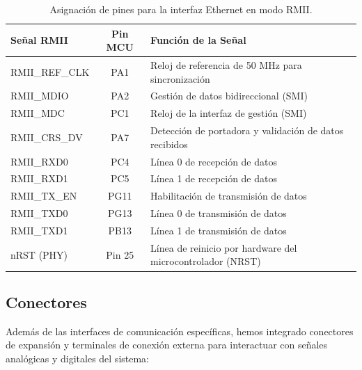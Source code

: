 \documentclass[12pt,a4paper]{article}
\begin{document}
\begin{table}[H]
\centering
\small
\begin{tabularx}{\textwidth}{|l|c|X|}
\hline
\textbf{Señal RMII} & \textbf{Pin MCU} & \textbf{Función de la Señal} \\ \hline
RMII\_REF\_CLK & PA1 & Reloj de referencia de 50 MHz para sincronización \\ \hline
RMII\_MDIO & PA2 & Gestión de datos bidireccional (SMI) \\ \hline
RMII\_MDC & PC1 & Reloj de la interfaz de gestión (SMI) \\ \hline
RMII\_CRS\_DV & PA7 & Detección de portadora y validación de datos recibidos \\ \hline
RMII\_RXD0 & PC4 & Línea 0 de recepción de datos \\ \hline
RMII\_RXD1 & PC5 & Línea 1 de recepción de datos \\ \hline
RMII\_TX\_EN & PG11 & Habilitación de transmisión de datos \\ \hline
RMII\_TXD0 & PG13 & Línea 0 de transmisión de datos \\ \hline
RMII\_TXD1 & PB13 & Línea 1 de transmisión de datos \\ \hline
nRST (PHY) & Pin 25 & Línea de reinicio por hardware del microcontrolador (NRST) \\ \hline
\end{tabularx}
\caption{Asignación de pines para la interfaz Ethernet en modo RMII.}
\label{tab:ethernet_pines}
\end{table}


\subsection{Conectores}
Además de las interfaces de comunicación específicas, hemos integrado conectores de expansión y terminales de conexión externa para interactuar con señales analógicas y digitales del sistema:
\end{document}
